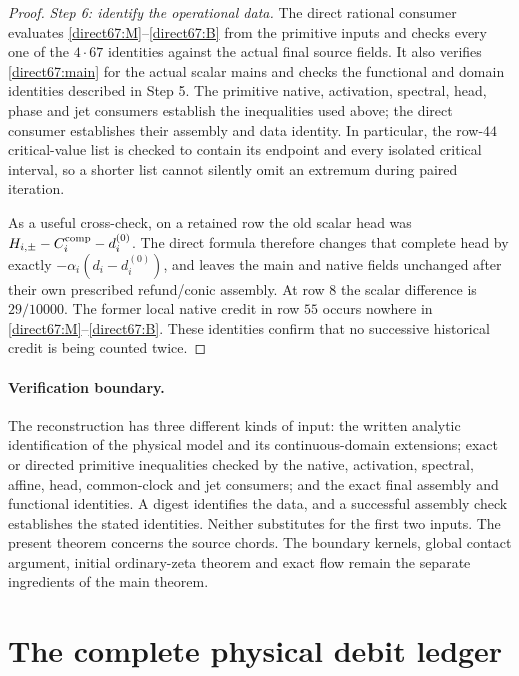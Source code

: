 \documentclass[11pt,a4paper]{article}
\theoremstyle{definition}
\theoremstyle{remark}
\begin{document}
\begin{proof}
\emph{Step 6: identify the operational data.}
The direct rational consumer
 evaluates
\eqref{direct67:M}--\eqref{direct67:B} from the primitive inputs and
checks every one of the $4\cdot67$ identities against the actual final
source fields.  It also verifies \eqref{direct67:main} for the actual
scalar mains and checks the functional and domain identities described
in Step 5.  The primitive native, activation, spectral, head, phase and
jet consumers establish the inequalities used above; the direct
consumer establishes their assembly and data identity.  In particular,
the row-$44$ critical-value list is checked to contain its endpoint and
every isolated critical interval, so a shorter list cannot silently
omit an extremum during paired iteration.

As a useful cross-check, on a retained row the old scalar head was
$H_{i,\pm}-C_i^{\rm comp}-d_i^{(0)}$.  The direct formula therefore
changes that complete head by exactly
$-\alpha_i(d_i-d_i^{(0)})$, and leaves the main and native fields
unchanged after their own prescribed refund/conic assembly.  At row
$8$ the scalar difference is $29/10000$.  The former local native
credit in row $55$ occurs nowhere in
\eqref{direct67:M}--\eqref{direct67:B}.  These identities confirm that
no successive historical credit is being counted twice.
\end{proof}

\paragraph{Verification boundary.}
The reconstruction has three different kinds of input: the written
analytic identification of the physical model and its continuous-domain
extensions; exact or directed primitive inequalities checked by the
native, activation, spectral, affine, head, common-clock and jet
consumers; and the exact final assembly and functional identities.
A digest identifies the data, and a successful assembly check establishes
the stated identities.  Neither substitutes for the first two inputs.
The present theorem concerns the source chords.  The boundary kernels,
global contact argument, initial ordinary-zeta theorem and exact flow
remain the separate ingredients of the main theorem.

\section{The complete physical debit ledger}
\label{app:physical-debit-ledger}
\end{document}
